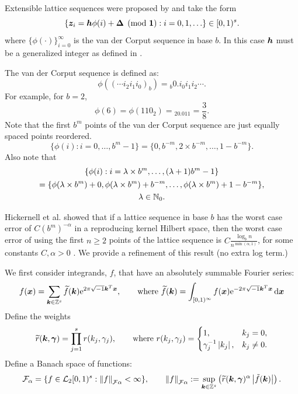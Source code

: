 \documentclass{iitthesis-au} %
\newcommand{\tr}{\widetilde{r}}
\newcommand{\LarysaNote}[1]{{\color{violet}#1}}
\begin{document}
Extensible lattice sequences were proposed by \cite{HicEtal00,Mai81a} and take the form
\begin{equation} \label{eq:extlat}
    \{\boldsymbol{z}_i = \boldsymbol{h}\phi(i)+ \boldsymbol{\Delta} \pmod{\boldsymbol{1}} : i=0,1, \ldots \} \in [0,1)^s.
\end{equation}
where $\{\phi(\cdot)\}_{i=0}^\infty$ is the van der Corput sequence in base $b$.  In this case $\boldsymbol{h}$ must be a generalized integer as defined in \cite[Section 2]{HicNie03a}.

The van der Corput sequence is defined as: 
\[
\phi((\cdots i_2 i_1 i_0)_b) = {}_b0.i_0 i_1 i_2 \cdots.
\]
For example, for $b=2$,
\[
\phi(6) = \phi(110_2) = {}_20.011 = \frac 38.
\]
Note that the first ${b^m}$ points of the van der Corput sequence are just equally spaced points reordered. 
\begin{equation} \label{eq:phipropone}
\{ \phi(i) : i = 0, \ldots, b^m-1 \} = \{0, b^{-m}, 2\times b^{-m}, \ldots, 1 - b^{-m} \}.
\end{equation}
Also note that
\begin{multline} \label{eq:phiproptwo}
\{ \phi(i) : i = \lambda \times b^m , \ldots, (\lambda+1)b^m-1 \} \\
= \{\phi(\lambda \times b^m) + 0, \phi(\lambda \times b^m) + b^{-m}, \ldots, \phi(\lambda \times b^m) + 1 - b^{-m} \} , \\
\lambda \in \mathbb{N}_{0}.
\end{multline}


\LarysaNote{Hickernell et al.} showed that if a lattice sequence in base $b$ has the worst case error of $C(b^m)^{-\alpha}$ in a reproducing kernel Hilbert space, then the worst case error of using the first $n \geq 2$ points of the lattice sequence is $ C \frac{\log_bn}{n^{\min(\alpha,1)}}$, for some constants $C, \alpha > 0$ \cite [Corollary 1]{HicEtal10a}. 
We provide a refinement of this result (\LarysaNote{no extra log term}.)

We first consider integrands, $f$, that have an absolutely summable Fourier series:
\begin{equation} \label{eq:fseries}
    f(\boldsymbol{x}) = \sum_{\boldsymbol{k} \in \mathbb{Z}^{s}} \widetilde{f}(\boldsymbol{k}) \mathrm{e}^{2 \pi \sqrt{-1} \boldsymbol{k}^T \boldsymbol{x}}, \qquad \text{where } \widetilde{f}(\boldsymbol{k}) = \int_{[0,1)^{\infty}} f(\boldsymbol{x}) \mathrm{e}^{-2 \pi \sqrt{-1} \boldsymbol{k}^T \boldsymbol{x}}\, {\rm d} \boldsymbol{x}
\end{equation}
Define the weights
\begin{equation}
\tr(\vk,\vgamma) = \prod_{j=1}^{s} r(k_{j},\gamma_{j}),
\qquad \text{where } r(k_{j},\gamma_{j})=\begin{cases} 1, &
k_{j}=0, \\ \gamma_{j}^{-1}\abs{k_{j}}, & k_{j} \ne 0.  \end{cases}
\end{equation}
Define a Banach
space of functions:
$$
\cf_{\alpha} = \{ f \in \cl_2[0,1)^{s} :
\norm[\cf{\alpha}]{f} < \infty \}, \qquad
\norm[\cf{\alpha}]{f} := \sup_{\vk \in \integers^{s}}
\left(\tr(\vk,\vgamma)^{\alpha} \abs{\tilde{f}(\vk)} \right).
$$
\end{document}
